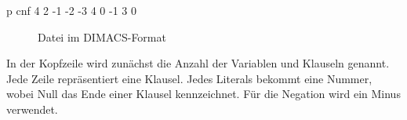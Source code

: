 \begin{verbbox}
  p cnf 4 2
  -1 -2 -3 4 0
  -1 3 0
\end{verbbox}
\begin{figure}[!h]
  \centering
  \theverbbox
  \caption{Datei im DIMACS-Format}
  \label{fig:dimacs}
\end{figure}

In der Kopfzeile wird zunächst die Anzahl der Variablen und Klauseln genannt. Jede Zeile repräsentiert eine Klausel.
Jedes Literals bekommt eine Nummer, wobei Null das Ende einer Klausel kennzeichnet. Für die Negation wird ein Minus verwendet.